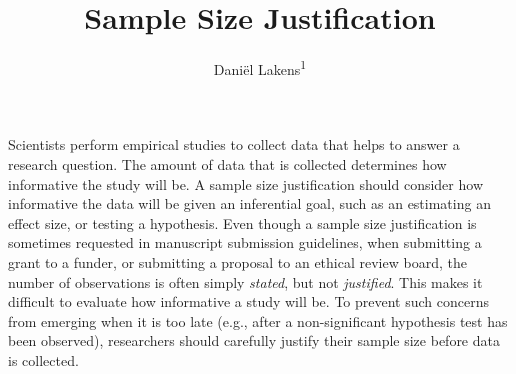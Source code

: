 \documentclass[
  english,
  ,jou, a4paper,floatsintext]{apa6}
\title{Sample Size Justification}
\author{Daniël Lakens\textsuperscript{1}}
\date{}
\affiliation{\vspace{0.5cm}\textsuperscript{1} Eindhoven University of Technology}
\begin{document}
\maketitle

Scientists perform empirical studies to collect data that helps to answer a research question. The amount of data that is collected determines how informative the study will be. A sample size justification should consider how informative the data will be given an inferential goal, such as an estimating an effect size, or testing a hypothesis. Even though a sample size justification is sometimes requested in manuscript submission guidelines, when submitting a grant to a funder, or submitting a proposal to an ethical review board, the number of observations is often simply \emph{stated}, but not \emph{justified}. This makes it difficult to evaluate how informative a study will be. To prevent such concerns from emerging when it is too late (e.g., after a non-significant hypothesis test has been observed), researchers should carefully justify their sample size before data is collected.
\end{document}
